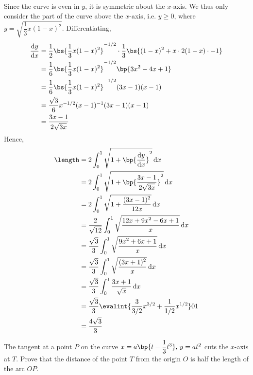 \documentclass{echw}
\begin{document}
    \solution
        Since the curve is even in $y$, it is symmetric about the $x$-axis. We thus only consider the part of the curve above the $x$-axis, i.e. $y \geq 0$, where $y = \sqrt{\dfrac13 x(1-x)^2}$. Differentiating,
        \begin{align*}
            \der{y}{x} &= \dfrac12 \bs{\dfrac13 x(1-x)^2}^{-1/2} \cdot \dfrac13 \bs{(1-x)^2 + x \cdot 2(1-x) \cdot -1}\\
            &= \dfrac16 \bs{\dfrac13 x(1-x)^2}^{-1/2} \bp{3x^2 - 4x + 1}\\
            &= \dfrac16 \bs{\dfrac13 x(1-x)^2}^{-1/2} (3x-1)(x-1)\\
            &= \dfrac{\sqrt{3}}6  x^{-1/2} (x-1)^{-1} (3x-1)(x-1)\\
            &= \dfrac{3x-1}{2\sqrt{3x}}
        \end{align*}
        Hence,
        \begin{align*}
            \length &= 2 \int_0^1 \sqrt{1 + \bp{\der{y}{x}}^2} \d x\\
            &= 2 \int_0^1 \sqrt{1 + \bp{\dfrac{3x-1}{2\sqrt{3x}}}^2} \d x\\
            &= 2 \int_0^1 \sqrt{1 + \dfrac{(3x-1)^2}{12x} } \d x\\
            &= \dfrac2{\sqrt{12}} \int_0^1 \sqrt{\dfrac{12 x + 9x^2 - 6x + 1}{x}} \d x\\
            &= \dfrac{\sqrt3}{3} \int_0^1 \sqrt{\dfrac{9x^2 + 6x + 1}{x}} \d x\\
            &= \dfrac{\sqrt3}{3} \int_0^1 \sqrt{\dfrac{(3x+1)^2}{x}} \d x\\
            &= \dfrac{\sqrt3}{3} \int_0^1 \dfrac{3x+1}{\sqrt{x}} \d x\\
            &= \dfrac{\sqrt3}{3} \evalint{\dfrac3{3/2} x^{3/2} + \dfrac1{1/2} x^{1/2}}01\\
            &= \dfrac{4\sqrt3}3
        \end{align*}

    \problem{}
        The tangent at a point $P$ on the curve $x = a\bp{t - \dfrac13 t^3}, \, y = at^2$ cuts the $x$-axis at $T$. Prove that the distance of the point $T$ from the origin $O$ is half the length of the arc $OP$.
\end{document}
